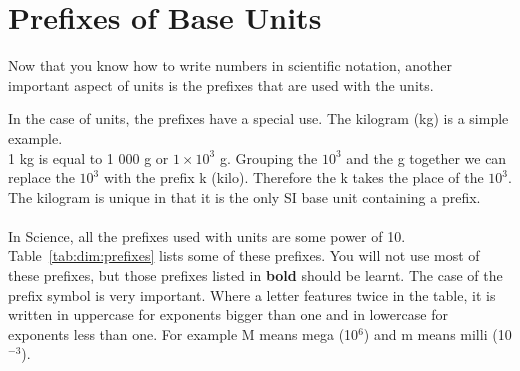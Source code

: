 \documentclass[10pt,a4paper,titlepage,twoside,openright]{report}
\begin{document}
\section{Prefixes of Base Units}
Now that you know how to write numbers in scientific notation, another important aspect of units is the prefixes that are used with the units. 


In the case of units, the prefixes have a special use. The kilogram (kg) is a simple example.\\ 1 kg is equal to 1 000 g or $1\times 10^3$ g. Grouping the $10^3$ and the g together we can replace the $10^3$ with the prefix k (kilo). Therefore the k takes the place of the $10^3$. \\
The kilogram is unique in that it is the only SI base unit containing a prefix.\\
\\
In Science, all the prefixes used with units are some power of 10. Table~\ref{tab:dim:prefixes} lists some of these prefixes. You will not use most of these prefixes, but those prefixes listed in \textbf{bold} should be learnt. The case of the prefix symbol is very important. Where a letter features twice in the table, it is written in uppercase for exponents bigger than one and in lowercase for exponents less than one. For example M means mega (10$^6$) and m means milli (10$^{-3}$).
\end{document}
